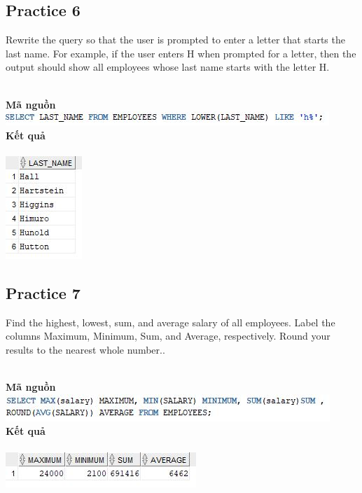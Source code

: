 \documentclass[12pt,a4paper]{report}
\begin{document}
\subsection{Practice 6}
\begin{boxedminipage}[t]{15.5cm}
	Rewrite the query so that the user is prompted to enter a letter that starts the last name. 
	For example, if the user enters H when prompted for a letter, then the output should show all 
	employees whose last name starts with the letter H.
\end{boxedminipage}
\newline
\\
\textbf{Mã nguồn}
\\
\newline
\includegraphics[scale=1]{65.jpg}\\
\textbf{Kết quả}\\\\
\includegraphics[scale=1]{k65.jpg}

\subsection{Practice 7}
\begin{boxedminipage}[t]{15.5cm}
Find the highest, lowest, sum, and average salary of all employees. 
Label the columns Maximum, Minimum, Sum, and Average, respectively. 
Round your results to the nearest whole number..
\end{boxedminipage}
\newline
\\
\textbf{Mã nguồn}
\\
\newline
\includegraphics[scale=1]{75.jpg}\\
\textbf{Kết quả}\\\\
\includegraphics[scale=1]{k75.jpg}
\end{document}
